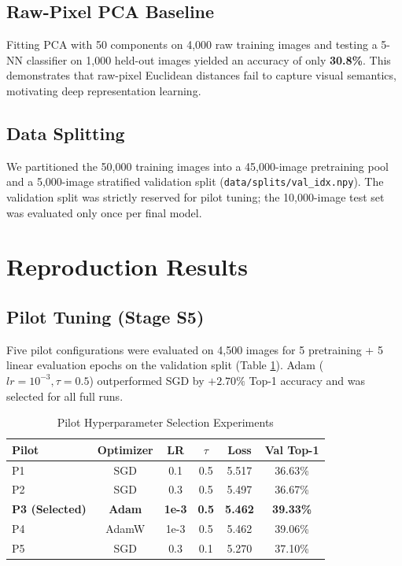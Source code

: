 \documentclass[conference]{IEEEtran}
\begin{document}
\subsection{Raw-Pixel PCA Baseline}
Fitting PCA with 50 components on 4,000 raw training images and testing a 5-NN classifier on 1,000 held-out images yielded an accuracy of only \textbf{30.8\%}. This demonstrates that raw-pixel Euclidean distances fail to capture visual semantics, motivating deep representation learning.

\subsection{Data Splitting}
We partitioned the 50,000 training images into a 45,000-image pretraining pool and a 5,000-image stratified validation split (\texttt{data/splits/val\_idx.npy}). The validation split was strictly reserved for pilot tuning; the 10,000-image test set was evaluated only once per final model.

\section{Reproduction Results}
\subsection{Pilot Tuning (Stage S5)}
Five pilot configurations were evaluated on 4,500 images for 5 pretraining + 5 linear evaluation epochs on the validation split (Table \ref{tab:pilots}). Adam ($lr=10^{-3}, \tau=0.5$) outperformed SGD by $+2.70\%$ Top-1 accuracy and was selected for all full runs.

\begin{table}[htbp]
\caption{Pilot Hyperparameter Selection Experiments}
\label{tab:pilots}
\centering
\small
\begin{tabular}{lccccc}
\toprule
\textbf{Pilot} & \textbf{Optimizer} & \textbf{LR} & \textbf{$\tau$} & \textbf{Loss} & \textbf{Val Top-1} \\ \midrule
P1 & SGD & 0.1 & 0.5 & 5.517 & 36.63\% \\
P2 & SGD & 0.3 & 0.5 & 5.497 & 36.67\% \\
\textbf{P3 (Selected)} & \textbf{Adam} & \textbf{1e-3} & \textbf{0.5} & \textbf{5.462} & \textbf{39.33\%} \\
P4 & AdamW & 1e-3 & 0.5 & 5.462 & 39.06\% \\
P5 & SGD & 0.3 & 0.1 & 5.270 & 37.10\% \\ \bottomrule
\end{tabular}
\end{table}
\end{document}

